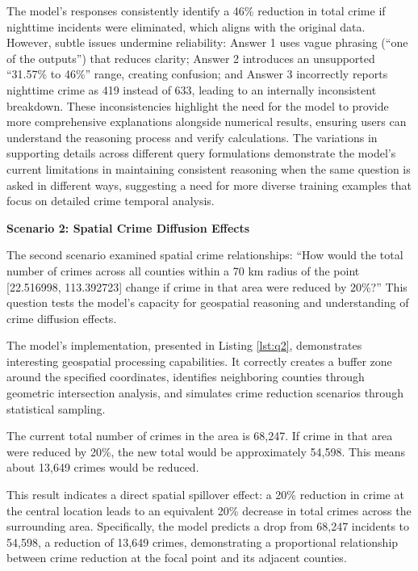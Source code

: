 The model's responses consistently identify a 46\% reduction in total crime if nighttime incidents were eliminated, which aligns with the original data. However, subtle issues undermine reliability: Answer 1 uses vague phrasing (``one of the outputs'') that reduces clarity; Answer 2 introduces an unsupported ``31.57\% to 46\%'' range, creating confusion; and Answer 3 incorrectly reports nighttime crime as 419 instead of 633, leading to an internally inconsistent breakdown. These inconsistencies highlight the need for the model to provide more comprehensive explanations alongside numerical results, ensuring users can understand the reasoning process and verify calculations. The variations in supporting details across different query formulations demonstrate the model's current limitations in maintaining consistent reasoning when the same question is asked in different ways, suggesting a need for more diverse training examples that focus on detailed crime temporal analysis.


\noindent \textbf{Scenario 2: Spatial Crime Diffusion Effects}  %

The second scenario examined spatial crime relationships: ``How would the total number of crimes across all counties within a 70 km radius of the point [22.516998, 113.392723] change if crime in that area were reduced by 20\%?'' This question tests the model's capacity for geospatial reasoning and understanding of crime diffusion effects.

The model's implementation, presented in Listing \ref{lst:q2}, demonstrates interesting geospatial processing capabilities. It correctly creates a buffer zone around the specified coordinates, identifies neighboring counties through geometric intersection analysis, and simulates crime reduction scenarios through statistical sampling.



\begin{tcolorbox}[colback=white!95!black, colframe=black, title=Q2 Response, fontupper=\scriptsize, boxsep=2pt, left=3pt, right=3pt]
  The current total number of crimes in the area is 68,247. If crime in that area were reduced by 20\%, the new total would be approximately 54,598. This means about 13,649 crimes would be reduced.
\end{tcolorbox}

This result indicates a direct spatial spillover effect: a 20\% reduction in crime at the central location leads to an equivalent 20\% decrease in total crimes across the surrounding area. Specifically, the model predicts a drop from 68,247 incidents to 54,598, a reduction of 13,649 crimes, demonstrating a proportional relationship between crime reduction at the focal point and its adjacent counties.

